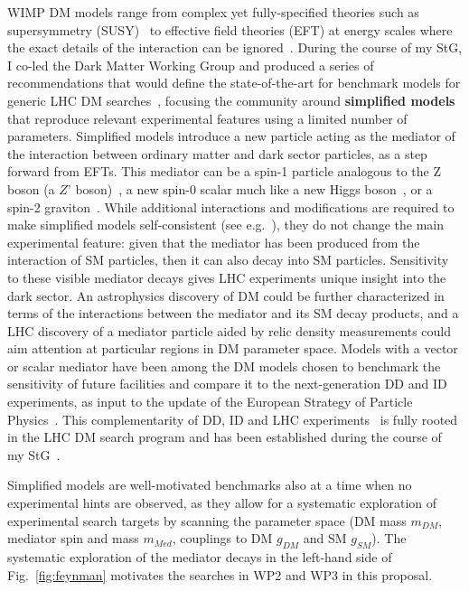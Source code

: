 WIMP DM models range from complex yet fully-specified theories such as supersymmetry (SUSY)~\cite{Martin:1997ns} to effective field theories (EFT) at energy scales where the exact details of the interaction can be ignored~\cite{Goodman:2010ku}. 
During the course of my StG, I co-led the Dark Matter Working Group and produced a series of recommendations that would define the state-of-the-art for benchmark models for generic LHC DM searches~\cite{Abercrombie:2015wmb}, focusing the community around \textbf{simplified models} that reproduce relevant experimental features using a limited number of parameters. 
Simplified models introduce a new particle acting as the mediator of the interaction between ordinary matter and dark sector particles, as a step forward from EFTs. 
This mediator can be a spin-1 particle analogous to the Z boson (a $Z’$ boson)~\cite{Shoemaker:2011vi,Buchmueller:2013dya,Chala:2015ama}, a new spin-0 scalar much like a new Higgs boson~\cite{Buckley:2014fba,Egana-Ugrinovic:2019dqu,Abe:2018bpo}, or a spin-2 graviton~\cite{Kang:2020huh}. 
While additional interactions and modifications are required to make simplified models self-consistent (see e.g.~\cite{Ellis:2018xal}), they do not change the main experimental feature: given that the mediator has been produced from the interaction of SM particles, then it can also decay into SM particles. 
Sensitivity to these visible mediator decays gives LHC experiments unique insight into the dark sector. 
An astrophysics discovery of DM could be further characterized in terms of the interactions between the mediator and its SM decay products, 
and a LHC discovery of a mediator particle aided by relic density measurements could aim attention at particular regions in DM parameter space. 
Models with a vector or scalar mediator have been among the DM models chosen to benchmark the sensitivity of future facilities and compare it to the next-generation DD and ID experiments, as input to the update of the European Strategy of Particle Physics~\cite{Strategy:2019vxc}.
This complementarity of DD, ID and LHC experiments~\cite{Bauer:2013ihz} is fully rooted in the LHC DM search program and has been established during the course of my StG~\cite{Boveia:2016mrp}.  

Simplified models are well-motivated benchmarks also at a time when no experimental hints are observed, as they allow for a systematic exploration of experimental search targets by scanning the parameter space (DM mass $m_{DM}$, mediator spin and mass $m_{Med}$, couplings to DM $g_{DM}$ and SM $g_{SM}$).
The systematic exploration of the mediator decays in the left-hand side of Fig.~\ref{fig:feynman} motivates the searches in WP2 and WP3 in this proposal. 

